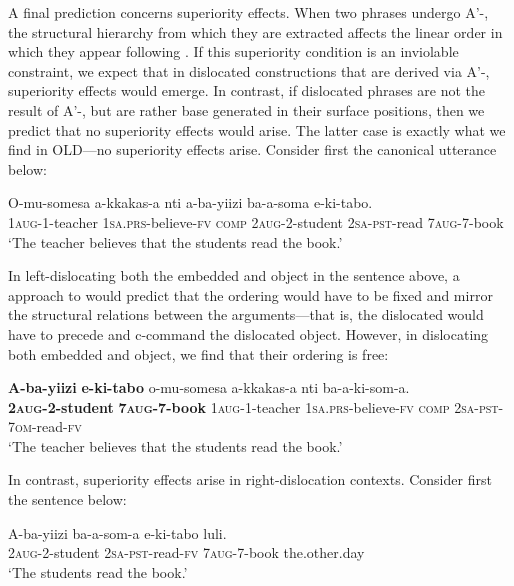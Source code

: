 \documentclass[output=paper
,newtxmath
,modfonts
,nonflat]{langsci/langscibook}
\begin{document}
\textup{A final prediction concerns superiority effects. When two phrases undergo A’-, the structural hierarchy from which they are extracted affects the linear order in which they appear following . If this superiority condition is an inviolable constraint, we expect that in dislocated constructions that are derived via A’-, superiority effects would emerge. In contrast, if dislocated phrases are not the result of A’-, but are rather base generated in their surface positions, then we predict that no superiority effects would arise. The latter case is exactly what we find in  OLD—no superiority effects arise. Consider first the canonical utterance below:}


\ea\label{ex:ranero:38}
\gll O-mu-somesa    a-kkakas-a                 nti        a-ba-yiizi           ba-a-soma     e-ki-tabo.\\
1\textsc{aug}{}-1-teacher \textsc{1sa.prs}{}-believe-\textsc{fv comp 2aug-2-}student \textsc{2sa-pst}{}-read 7\textsc{aug}{}-7-book\\
\glt ‘The teacher believes that the students read the book.’
\z

In left-dislocating both the embedded  and object in the sentence above, a  approach to  would predict that the ordering would have to be fixed and mirror the structural relations between the arguments—that is, the dislocated  would have to precede and c-command the dislocated object. However, in dislocating both embedded  and object, we find that their ordering is free:

\ea\label{ex:ranero:39}
\gll \textbf{A-ba-yiizi}           \textbf{{\textbar}{\textbar} e-ki-tabo}        o-mu-somesa     a-kkakas-a            nti  ba-a-ki-som-a.\\
\textbf{2\textsc{aug}}\textbf{{}-2-student}   \textbf{7}\textbf{\textsc{aug}}\textbf{{}-7-book} 1\textsc{aug}{}-1-teacher \textsc{1sa.prs}{}-believe-\textsc{fv} \textsc{comp} \textsc{2sa-pst-7om}{}-read\textsc{{}-fv}\\
\glt \textsc{‘}The teacher believes that the students read the book.’
\z

\textup{In contrast, superiority effects arise in right-dislocation contexts. Consider first the sentence below:}

\ea\label{ex:ranero:40}
\gll A-ba-yiizi       ba-a-som-a  e-ki-tabo   luli.\\
2\textsc{aug}{}-2-student \textsc{2sa-pst}{}-read-\textsc{fv} 7\textsc{aug}{}-7-book the.other.day\\
\glt ‘The students read the book.’
\z
\end{document}
